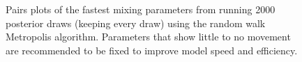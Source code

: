 \documentclass[
]{scrartcl}
\begin{document}
\newpage

\begin{figure}[H]


\caption{\label{fig-pairs_plot_fast}Pairs plots of the fastest mixing
parameters from running 2000 posterior draws (keeping every draw) using
the random walk Metropolis algorithm. Parameters that show little to no
movement are recommended to be fixed to improve model speed and
efficiency.}

\end{figure}%
\end{document}
